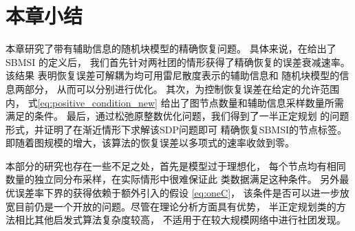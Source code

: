 

\section{本章小结}\label{sec:summary_sbmsi}
本章研究了带有辅助信息的随机块模型的精确恢复问题。
具体来说，在给出了 SBMSI 的定义后， 
我们首先针对两社团的情形获得了精确恢复的误差衰减速率。
该结果
表明恢复误差可解耦为均可用雷尼散度表示的辅助信息和
随机块模型的信息两部分，
从而可以分别进行优化。
其次，为控制恢复误差在给定的允许范围内，
式\eqref{eq:positive_condition_new}
给出了图节点数量和辅助信息采样数量所需满足的条件。
最后，通过松弛原整数优化问题，我们得到了一半正定规划
的问题形式，并证明了在渐近情形下求解该SDP问题即可
精确恢复SBMSI的节点标签。即随着图规模的增大，该算法的恢复误差以多项式的速率收敛到零。

本部分的研究也存在一些不足之处，首先是模型过于理想化，
每个节点均有相同数量的独立同分布采样，在实际情形中很难保证此
类数据满足这种条件。
另外最优误差率下界的获得依赖于额外引入的假设 \eqref{eq:oneC}，
该条件是否可以进一步放宽目前仍是一个开放的问题。尽管在理论分析方面具有优势，
半正定规划类的方法相比其他启发式算法复杂度较高，
不适用于在较大规模网络中进行社团发现。



